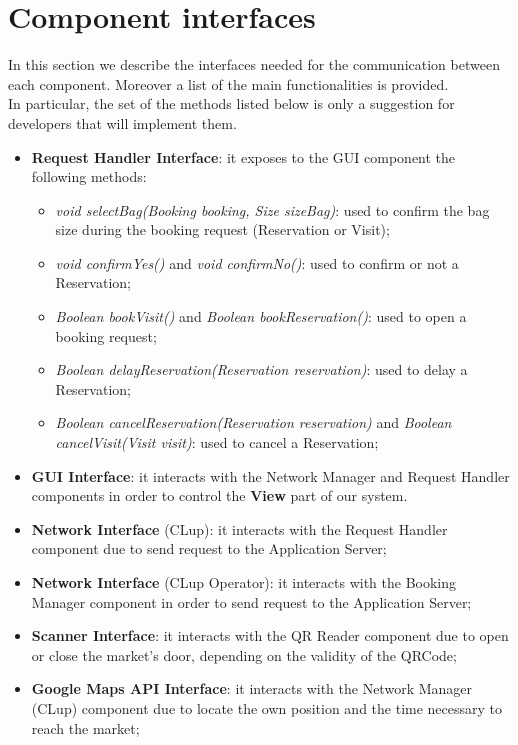 \section{Component interfaces}
In this section we describe the interfaces needed for the communication between each component. Moreover a list of the main functionalities is provided.\\
In particular, the set of the methods listed below is only a suggestion for developers that will implement them.
\begin{itemize}

\item \textbf{Request Handler Interface}: it exposes to the GUI component the following methods:
\begin{itemize}
\item \textit{void selectBag(Booking booking, Size sizeBag)}: used to confirm the bag size during the booking request (Reservation or Visit);
\item \textit{void confirmYes()} and \textit{void confirmNo()}: used to confirm or not a Reservation;
\item \textit{Boolean bookVisit()} and \textit{Boolean bookReservation()}: used to open a booking request;
\item \textit{Boolean delayReservation(Reservation reservation)}: used to delay a Reservation;
\item \textit{Boolean cancelReservation(Reservation reservation)} and \textit{Boolean cancelVisit(Visit visit)}: used to cancel a Reservation;
\end{itemize}

\item \textbf{GUI Interface}: it interacts with the Network Manager and Request Handler components in order to control the \textbf{View} part of our system. 

\item \textbf{Network Interface} (CLup): it interacts with the Request Handler component due to send request to the Application Server;

\item \textbf{Network Interface} (CLup Operator): it interacts with the Booking Manager component in order to send request to the Application Server;


\item \textbf{Scanner Interface}: it interacts with the QR Reader component due to open or close the market's door, depending on the validity of the QRCode;

\item \textbf{Google Maps API Interface}: it interacts with the Network Manager (CLup) component due to locate the own position and the time necessary to reach the market;



\end{itemize}
